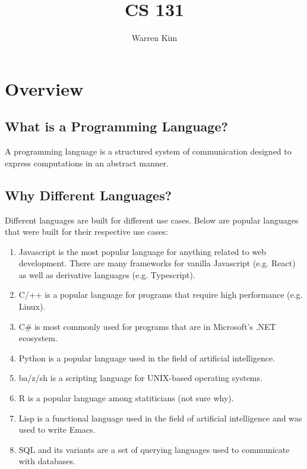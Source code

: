 \documentclass{article}
\title{CS 131}
\author{Warren Kim}
\begin{document}
\maketitle

\tableofcontents

\newpage
\section{Overview}

\subsection{What is a Programming Language?}  A programming language
is a structured system of communication designed to express
computations in an abstract manner.





\subsection{Why Different Languages?}  Different languages are built
for different use cases. Below are popular languages that were built
for their respective use cases:
\begin{enumerate}[label=(\roman*),align=left]
\item Javascript is the most popular language for anything related to
web development. There are many frameworks for vanilla Javascript
(e.g. React) as well as derivative languages (e.g. Typescript).
\item C/++ is a popular language for programs that require high
performance (e.g. Linux).
\item C\# is most commonly used for programs that are in Microsoft's
.NET ecosystem.
\item Python is a popular language used in the field of artificial
intelligence.
\item ba/z/sh is a scripting language for UNIX-based operating
systems.
\item R is a popular language among statiticians (not sure why).
\item Lisp is a functional language used in the field of artificial
intelligence and was used to write Emacs.
\item SQL and its variants are a set of querying languages used to
communicate with databases.
\end{enumerate}
\end{document}
